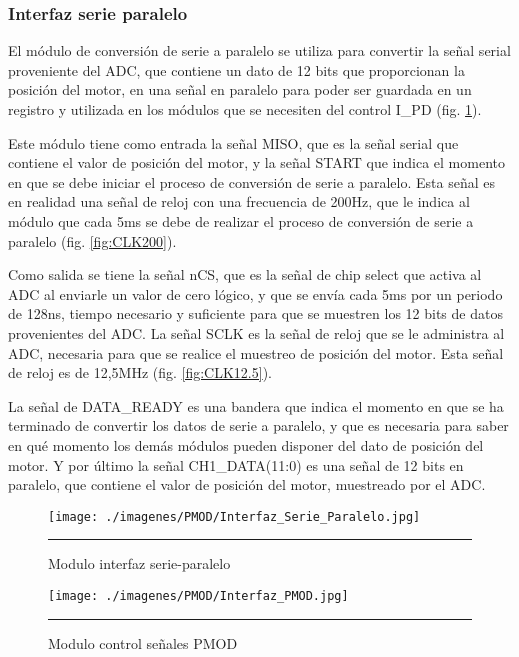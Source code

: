 \documentclass[12pt,a4paper]{article} %
\begin{document}
\subsubsection{Interfaz serie paralelo}

El módulo de conversión de serie a paralelo se utiliza para convertir la señal serial proveniente del ADC, que contiene un dato de 12 bits que proporcionan la posición del motor, en una señal en paralelo para poder ser guardada en un registro y utilizada en los módulos que se necesiten del control I\_PD (fig. \ref{fig:ser_par}).

Este módulo tiene como entrada la señal MISO, que es la señal serial que contiene el valor de posición del motor, y la señal START que indica el momento en que se debe iniciar el proceso de conversión de serie a paralelo. Esta señal es en realidad una señal de reloj con una frecuencia de 200Hz, que le indica al módulo que cada 5ms se debe de realizar el proceso de conversión de serie a paralelo (fig. \ref{fig:CLK200}). 

Como salida se tiene la señal nCS, que es la señal de chip select que activa al ADC al enviarle un valor de cero lógico, y que se envía cada 5ms por un periodo de 128ns, tiempo necesario y suficiente para que se muestren los 12 bits de datos provenientes del ADC. La señal SCLK es la señal de reloj que se le administra al ADC, necesaria para que se realice el muestreo de posición del motor. Esta señal de reloj es de 12,5MHz (fig. \ref{fig:CLK12.5}). 

La señal de DATA\_READY es una bandera que indica el momento en que se ha terminado de convertir los datos de serie a paralelo, y que es necesaria para saber en qué momento los demás módulos pueden disponer del dato de posición del motor. Y por último la señal CH1\_DATA(11:0) es  una señal de 12 bits en paralelo, que contiene el valor de posición del motor, muestreado por el ADC.

\begin{figure}[htbp]
  \centering
    \texttt{[image: ./imagenes/PMOD/Interfaz\_Serie\_Paralelo.jpg]}
    \rule{35em}{0.3pt}
  \caption[ser_par]{Modulo interfaz serie-paralelo}
  \label{fig:ser_par}
\end{figure}

\begin{figure}[htbp]
  \centering
    \texttt{[image: ./imagenes/PMOD/Interfaz\_PMOD.jpg]}
    \rule{35em}{0.3pt}
  \caption[PMOD]{Modulo control señales PMOD}
  \label{fig:PMOD}
\end{figure}
\end{document}
